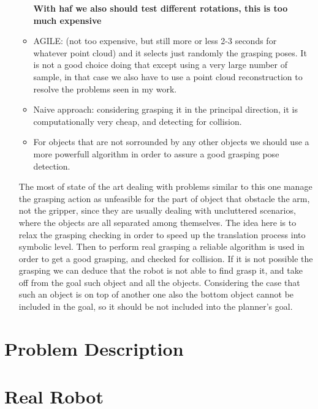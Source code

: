 \begin{itemize}
\begin{itemize}
\textbf{With haf we also should test different rotations, this is too much expensive}
\item AGILE: (not too expensive, but still more or less 2-3 seconds for whatever point cloud) and it selects just randomly the grasping poses. It is not a good choice doing that except using a very large number of sample, in that case we also have to use a point cloud reconstruction to resolve the problems seen in my work. 
\item Naive approach: considering grasping it in the principal direction, it is computationally very cheap, and detecting for collision.
\item For objects that are not sorrounded by any other objects we should use a more powerfull algorithm in order to assure a good grasping pose detection.
\end{itemize} 
The most of state of the art dealing with problems similar to this one manage the grasping action as unfeasible for the part of object that obstacle the arm, not the gripper, since they are usually dealing with uncluttered scenarios, where the objects are all separated among themselves. The idea here is to relax the grasping checking in order to speed up the translation process into symbolic level. Then to perform real grasping a reliable algorithm is used in order to get a good grasping, and checked for collision. If it is not possible the grasping we can deduce that the robot is not able to find grasp it, and take off from the goal such object and all the objects. Considering the case that such an object is on top of another one also the bottom object cannot be included in the goal, so it should be not included into the planner's goal.
\end{itemize}
\fi


\section{Problem Description}
\section{Real Robot }


